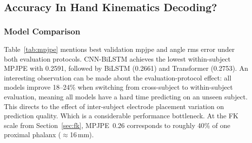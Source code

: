 \documentclass[11pt]{article}
\begin{document}
\subsection{Accuracy In Hand Kinematics Decoding?}

\subsubsection{Model Comparison}

Table~\ref{tab:mpjpe} mentions best validation \gls{mpjpe} and  angle \gls{rms} error under both evaluation protocols. CNN-BiLSTM achieves the lowest within-subject MPJPE with 0.2591, followed by BiLSTM (0.2661) and Transformer (0.2753). An interesting observation can be made about the evaluation-protocol effect: all models improve 18--24\% when switching from cross-subject to within-subject evaluation, meaning all models have a hard time predicting on an unseen subject. This directs to the effect of inter-subject electrode placement variation on prediction quality. Which is a considerable performance bottleneck. At the FK scale from Section~\ref{sec:fk}, MPJPE~0.26 corresponds to roughly 40\% of one proximal phalanx ($\approx$16\,mm).

\begin{table}[H]
\centering
\caption{Best validation MPJPE and angle RMSE per model. $^\dagger$TCN stopped early at plateau. NRMSE$^*$ = mean(RMSE$_j$/ROM$_j$) over 22 sensors \cite{lin2025parallel}.}
\label{tab:mpjpe}
\end{table}
\end{document}
